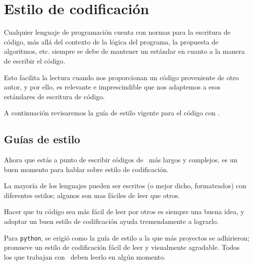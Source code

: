 \section{Estilo de codificación}
Cualquier lenguaje de programación cuenta con normas para la escritura de código, más allá del contexto de la lógica del programa, la propuesta de algoritmos, etc. siempre se debe de mantener un estándar en cuanto a la manera de escribir el código.
\par
Esto facilita la lectura cuando nos proporcionan un código proveniente de otro autor, y por ello, es relevante e imprescindible que nos adaptemos a esos estándares de escritura de código.
\par
A continuación revisaremos la guía de estilo vigente para el código con \python.
\subsection{Guías de estilo}
Ahora que estás a punto de escribir códigos de \python\ más largos y complejos, es un buen momento para hablar sobre estilo de codificación.
\par
La mayoría de los lenguajes pueden ser escritos (o mejor dicho, formateados) con diferentes estilos; algunos son mas fáciles de leer que otros.
\par
Hacer que tu código sea más fácil de leer por otros es siempre una buena idea, y adoptar un buen estilo de codificación ayuda tremendamente a lograrlo.
\par
Para \texttt{python},  se erigió como la guía de estilo a la que más proyectos se adhirieron; promueve un estilo de codificación fácil de leer y visualmente agradable. Todos los que trabajan con \python\ deben leerlo en algún momento.

